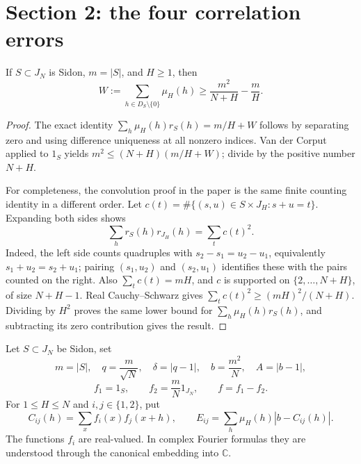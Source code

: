\section{Section 2: the four correlation errors}

\begin{lemma}
\label{core:captured-mass}
If $S\subset J_N$ is Sidon, $m=|S|$, and $H\geq1$, then
\[
 W:=\sum_{h\in D_S\setminus\{0\}}\mu_H(h)
 \geq\frac{m^2}{N+H}-\frac mH.
\]
\end{lemma}
\begin{proof}
The exact identity
$\sum_h\mu_H(h)r_S(h)=m/H+W$ follows by separating zero
and using difference uniqueness at all nonzero indices.
Van der Corput applied to $1_S$ yields
$m^2\leq(N+H)(m/H+W)$; divide by the positive number $N+H$.

For completeness, the convolution proof in the paper is the same
finite counting identity in a different order.  Let
$c(t)=\#\{(s,u)\in S\times J_H:s+u=t\}$.  Expanding both sides
shows
\[
 \sum_h r_S(h)r_{J_H}(h)=\sum_t c(t)^2.
\]
Indeed, the left side counts quadruples with
$s_2-s_1=u_2-u_1$, equivalently $s_1+u_2=s_2+u_1$;
pairing $(s_1,u_2)$ and $(s_2,u_1)$ identifies these with the
pairs counted on the right.  Also $\sum_t c(t)=mH$, and $c$ is
supported on $\{2,\ldots,N+H\}$, of size $N+H-1$.
Real Cauchy--Schwarz gives
$\sum_t c(t)^2\geq(mH)^2/(N+H)$.
Dividing by $H^2$ proves the same lower bound for
$\sum_h\mu_H(h)r_S(h)$, and subtracting its zero contribution
gives the result.
\end{proof}

\begin{definition}
\label{core:errors}
Let $S\subset J_N$ be Sidon, set
\[
 m=|S|,\quad q=\frac m{\sqrt N},\quad
 \delta=|q-1|,\quad b=\frac{m^2}{N},\quad A=|b-1|,
\]
\[
 f_1=1_S,\qquad f_2=\frac mN1_{J_N},\qquad f=f_1-f_2.
\]
For $1\leq H\leq N$ and $i,j\in\{1,2\}$, put
\[
 C_{ij}(h)=\sum_x f_i(x)f_j(x+h),\qquad
 E_{ij}=\sum_h\mu_H(h)|b-C_{ij}(h)|.
\]
The functions $f_i$ are real-valued.  In complex Fourier formulas
they are understood through the canonical embedding into $\mathbb C$.
\end{definition}


